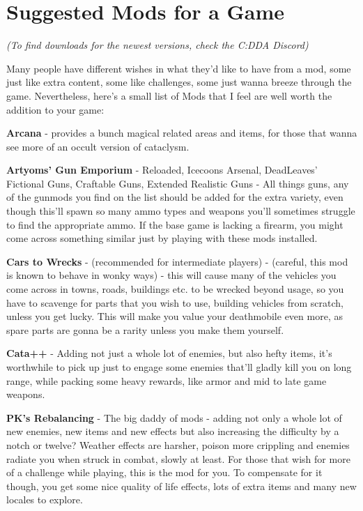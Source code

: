\section{Suggested Mods for a Game}

\textit{(To find downloads for the newest versions, check the C:DDA Discord)}

Many people have different wishes in what they'd like to have from a mod, some just like extra content, some like challenges, some just wanna breeze through the game. Nevertheless, here's a small list of Mods that I feel are well worth the addition to your game:

\textbf{Arcana} - provides a bunch magical related areas and items, for those that wanna see more of an occult version of cataclysm.

\textbf{Artyoms' Gun Emporium} - Reloaded, Icecoons Arsenal, DeadLeaves' Fictional Guns, Craftable Guns, Extended Realistic Guns - All things guns, any of the gunmods you find on the list should be added for the extra variety, even though this'll spawn so many ammo types and weapons you'll sometimes struggle to find the appropriate ammo. If the base game is lacking a firearm, you might come across something similar just by playing with these mods installed.

\textbf{Cars to Wrecks} - (recommended for intermediate players) -
(careful, this mod is known to behave in wonky ways) - this will cause many of the vehicles you come across in towns, roads, buildings etc. to be wrecked beyond usage, so you have to scavenge for parts that you wish to use, building vehicles from scratch, unless you get lucky. This will make you value your deathmobile even more, as spare parts are gonna be a rarity unless you make them yourself.

\textbf{Cata++} - Adding not just a whole lot of enemies, but also hefty items, it's worthwhile to pick up just to engage some enemies that'll gladly kill you on long range, while packing some heavy rewards, like armor and mid to late game weapons.

\textbf{PK's Rebalancing} - The big daddy of mods - adding not only a whole lot of new enemies, new items and new effects but also increasing the difficulty by a notch or twelve? Weather effects are harsher, poison more crippling and enemies radiate you when struck in combat, slowly at least. For those that wish for more of a challenge while playing, this is the mod for you. To compensate for it though, you get some nice quality of life effects, lots of extra items and many new locales to explore.

